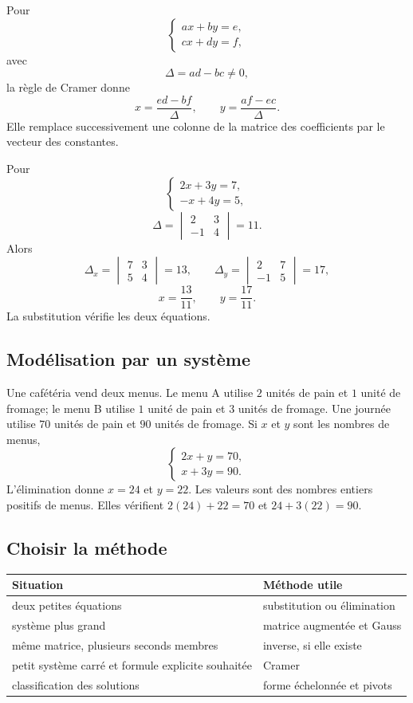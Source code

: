 Pour
\[
\begin{cases}
ax+by=e,\\
cx+dy=f,
\end{cases}
\]
avec
\[
\Delta=ad-bc\neq0,
\]
la règle de Cramer donne
\[
x=\frac{ed-bf}{\Delta},
\qquad
 y=\frac{af-ec}{\Delta}.
\]
Elle remplace successivement une colonne de la matrice des coefficients par le vecteur des constantes.

\begin{examplebox}
Pour
\[
\begin{cases}
2x+3y=7,\\
-x+4y=5,
\end{cases}
\]
\[
\Delta=\begin{vmatrix}2&3\\-1&4\end{vmatrix}=11.
\]
Alors
\[
\Delta_x=\begin{vmatrix}7&3\\5&4\end{vmatrix}=13,
\qquad
\Delta_y=\begin{vmatrix}2&7\\-1&5\end{vmatrix}=17,
\]
\[
x=\frac{13}{11},
\qquad y=\frac{17}{11}.
\]
La substitution vérifie les deux équations.
\end{examplebox}

\subsection{Modélisation par un système}

Une cafétéria vend deux menus. Le menu A utilise $2$ unités de pain et $1$ unité de fromage; le menu B utilise $1$ unité de pain et $3$ unités de fromage. Une journée utilise $70$ unités de pain et $90$ unités de fromage. Si $x$ et $y$ sont les nombres de menus,
\[
\begin{cases}
2x+y=70,\\
x+3y=90.
\end{cases}
\]
L'élimination donne $x=24$ et $y=22$. Les valeurs sont des nombres entiers positifs de menus. Elles vérifient $2(24)+22=70$ et $24+3(22)=90$.

\subsection{Choisir la méthode}

\begin{center}
\begin{tabularx}{\textwidth}{@{}lY@{}}
\toprule
Situation & Méthode utile\\\midrule
deux petites équations & substitution ou élimination\\
système plus grand & matrice augmentée et Gauss\\
même matrice, plusieurs seconds membres & inverse, si elle existe\\
petit système carré et formule explicite souhaitée & Cramer\\
classification des solutions & forme échelonnée et pivots\\
\bottomrule
\end{tabularx}
\end{center}
